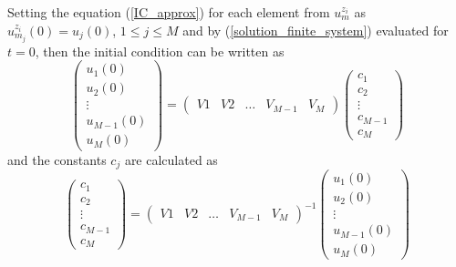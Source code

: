 	\noindent Setting the equation (\ref{IC_approx}) for each element from $u^{z_i}_m$ as $u^{z_i}_{m_j} (0) = u_j (0)$, $1 \leq j \leq M$ and by (\ref{solution_finite_system}) evaluated for $t=0$, then the initial condition can be written as
	\begin{equation*}	
		\begin{pmatrix}
			u_1 (0) \\ u_2 (0) \\ \vdots \\ u_{M-1} (0) \\	u_M (0)
		\end{pmatrix}
		= 
		\begin{pmatrix}
			V1 & V2 & \dots & V_{M-1} & V_M
		\end{pmatrix}
		\begin{pmatrix}
			c_1 \\ c_2 \\ \vdots \\ c_{M-1} \\ c_M
		\end{pmatrix}
	\end{equation*}
	and the constants $c_j$ are calculated as
	\begin{equation*}
		\begin{pmatrix}
			c_1 \\ c_2 \\ \vdots \\ c_{M-1} \\ c_M 
		\end{pmatrix}
		=	
		\begin{pmatrix}
			V1 & V2 & \dots & V_{M-1} & V_M
		\end{pmatrix}^{-1}
		\begin{pmatrix}
			u_1 (0) \\ u_2 (0) \\ \vdots \\ u_{M-1} (0) \\	u_M (0)
		\end{pmatrix}
	\end{equation*}
